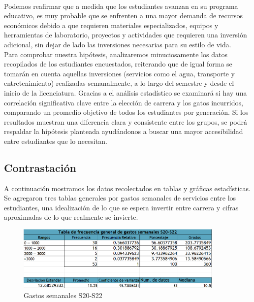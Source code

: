 \documentclass[letterpaper,12pt]{article}
\begin{document}
\begin{sloppypar}
\vspace{0.3cm}\\
Podemos reafirmar que a medida que los estudiantes avanzan en su programa educativo, es muy probable que se enfrenten a una mayor demanda de recursos económicos debido a que requieren materiales especializados, equipos y herramientas de laboratorio, proyectos y actividades que requieren una inversión adicional, sin dejar de lado las inversiones necesarias para su estilo de vida. 
\vspace{0.3cm}\\
Para comprobar nuestra hipótesis, analizaremos minuciosamente los datos recopilados de los estudiantes encuestados, reiterando que de igual forma se tomarán en cuenta aquellas inversiones (servicios como el agua, transporte y entretenimiento) realizadas semanalmente, a lo largo del semestre y desde el inicio de la licenciatura. Gracias a el análisis estadístico se examinará si hay una correlación significativa clave entre la elección de carrera y los gatos incurridos, comparando un promedio objetivo de todos los estudiantes por generación. Si los resultados muestran una diferencia clara y consistente entre los grupos, se podrá respaldar la hipótesis planteada ayudándonos a buscar una mayor accesibilidad entre estudiantes que lo necesitan.

\newpage
\begin{center}
    \section*{Contrastación}
\end{center}
A continuación mostramos los datos recolectados en tablas y gráficas estadísticas. Se agregaron tres tablas generales por gastos semanales de servicios entre los estudiantes, una idealización de lo que se espera invertir entre carrera y cifras aproximadas de lo que realmente se invierte.

\begin{figure}[H]
    \centering
    \includegraphics[width=0.9\textwidth]{images/probabilidad/Tabla de frecuencia general de gastos semanales s20-s22.PNG}
    \caption{Gastos semanales S20-S22}
\end{figure}


\end{sloppypar}
\end{document}
